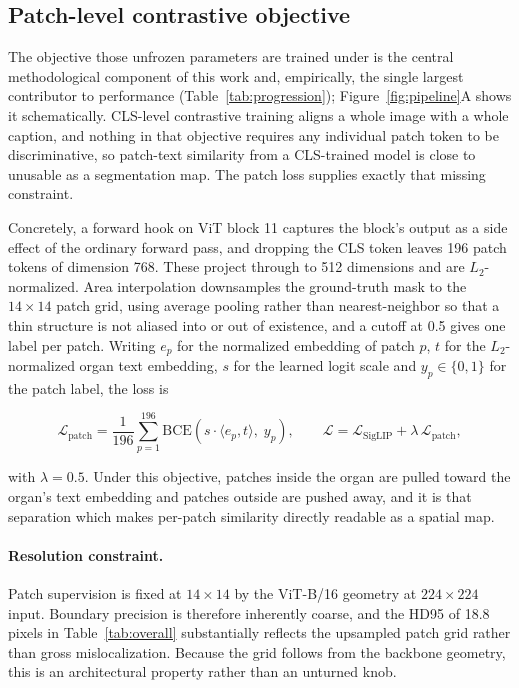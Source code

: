 \subsection{Patch-level contrastive objective}
\label{sec:methods:patchloss}

The objective those unfrozen parameters are trained under is the central
methodological component of this work and, empirically, the single largest
contributor to performance (Table~\ref{tab:progression});
Figure~\ref{fig:pipeline}A shows it schematically. CLS-level contrastive
training aligns a whole image with a whole caption, and nothing in that
objective requires any individual patch token to be discriminative, so
patch-text similarity from a CLS-trained model is close to unusable as a
segmentation map. The patch loss supplies exactly that missing constraint.

Concretely, a forward hook on ViT block 11 captures the block's output as a side
effect of the ordinary forward pass, and dropping the CLS token leaves 196 patch
tokens of dimension 768. These project through  to 512
dimensions and are $L_2$-normalized. Area interpolation downsamples the
ground-truth mask to the $14\times14$ patch grid, using average pooling rather
than nearest-neighbor so that a thin structure is not aliased into or out of
existence, and a cutoff at 0.5 gives one label per patch. Writing $e_p$ for the
normalized embedding of patch $p$, $t$ for the $L_2$-normalized organ text
embedding, $s$ for the learned logit scale and $y_p \in \{0,1\}$ for the patch
label, the loss is

\begin{equation}
\mathcal{L}_{\text{patch}}
  = \frac{1}{196}\sum_{p=1}^{196}
    \mathrm{BCE}\!\left(s \cdot \langle e_p, t\rangle,\; y_p\right),
\qquad
\mathcal{L} = \mathcal{L}_{\text{SigLIP}} + \lambda\,\mathcal{L}_{\text{patch}},
\end{equation}

with $\lambda = 0.5$. Under this objective, patches inside the organ are pulled
toward the organ's text embedding and patches outside are pushed away, and it is
that separation which makes per-patch similarity directly readable as a spatial
map.

\paragraph{Resolution constraint.}
Patch supervision is fixed at $14\times14$ by the ViT-B/16 geometry at
$224\times224$ input. Boundary precision is therefore inherently coarse, and the
HD95 of 18.8 pixels in Table~\ref{tab:overall} substantially reflects the
upsampled patch grid rather than gross mislocalization. Because the grid follows
from the backbone geometry, this is an architectural property rather than an
unturned knob.

